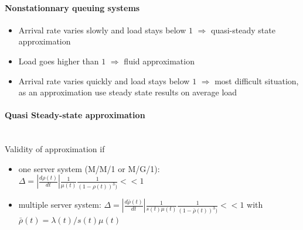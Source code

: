 \documentclass[paper=a4,fontsize=8pt,pagesize,DIV=calc]{scrartcl}
\newcounter{row}
\begin{document}
\begin{multicols}{3}
\paragraph{Nonstationnary queuing systems}
\begin{itemize}
\item Arrival rate varies slowly and load stays below $1$ $\Rightarrow$ quasi-steady state approximation
\item Load goes higher than $1$ $\Rightarrow$ fluid approximation
\item Arrival rate varies quickly and load stays below $1$ $\Rightarrow$ most difficult situation, as an approximation use steady state results on average load
\end{itemize}
\paragraph{Quasi Steady-state approximation}~~\\
Validity of approximation if
\begin{itemize}
\item one server system (M/M/1 or M/G/1):
\\$\Delta=\left|\frac{d\rho(t)}{dt}\right|\frac{1}{\mu(t)} \frac{1}{(1-\rho(t))^3)}<<1$
\item  multiple server system: $\Delta=\left|\frac{d\bar{\rho}(t)}{dt}\right|\frac{1}{s(t)\mu(t)} \frac{1}{(1-\bar{\rho}(t))^3)}<<1$ with $\bar{\rho}(t)=\lambda(t)/s(t)\mu(t)$
\end{itemize}

\end{multicols}
\end{document}
